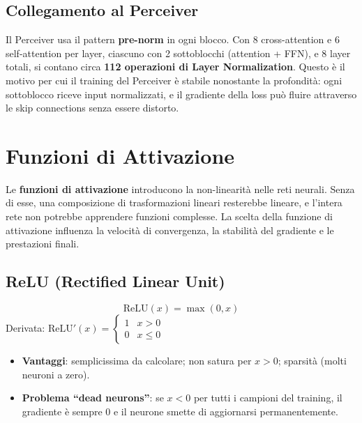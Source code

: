 \documentclass[
  11pt,
]{article}
\begin{document}
\subsection{Collegamento al Perceiver}

\begin{notabox}[title={\textbf{Layer Normalization nel Perceiver IO}}]
Il Perceiver usa il pattern \textbf{pre-norm} in ogni blocco. Con 8 cross-attention e 6 self-attention per layer, ciascuno con 2 sottoblocchi (attention + FFN), e 8 layer totali, si contano circa \textbf{112 operazioni di Layer Normalization}. Questo è il motivo per cui il training del Perceiver è stabile nonostante la profondità: ogni sottoblocco riceve input normalizzati, e il gradiente della loss può fluire attraverso le skip connections senza essere distorto.
\end{notabox}

\section{Funzioni di Attivazione}
\label{app:activations}

Le \textbf{funzioni di attivazione} introducono la non-linearità nelle reti neurali. Senza di esse, una composizione di trasformazioni lineari resterebbe lineare, e l'intera rete non potrebbe apprendere funzioni complesse. La scelta della funzione di attivazione influenza la velocità di convergenza, la stabilità del gradiente e le prestazioni finali.

\subsection{ReLU (Rectified Linear Unit)}

\begin{formulabox}[title={\textbf{ReLU}}]
\[
\text{ReLU}(x) = \max(0, x)
\]
Derivata: $\text{ReLU}'(x) = \begin{cases} 1 & x > 0 \\ 0 & x \leq 0 \end{cases}$
\end{formulabox}

\begin{itemize}
  \item \textbf{Vantaggi}: semplicissima da calcolare; non satura per $x > 0$; sparsità (molti neuroni a zero).
  \item \textbf{Problema ``dead neurons''}: se $x < 0$ per tutti i campioni del training, il gradiente è sempre 0 e il neurone smette di aggiornarsi permanentemente.
\end{itemize}
\end{document}

